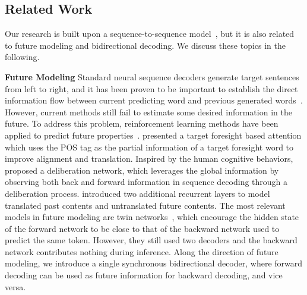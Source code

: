 \documentclass[11pt,a4paper]{article}
\begin{document}
\begin{CJK*}{UTF8}{gbsn}
\section{Related Work}

Our research is built upon a sequence-to-sequence model~\cite{vaswani2017attention}, but it is also related to future modeling and bidirectional decoding. We discuss these topics in the following.

\textbf{Future Modeling} Standard neural sequence decoders generate target sentences from left to right,
and it has been proven to be important to establish the direct information flow between current predicting word and previous generated words~\cite{zhou2017,vaswani2017attention}.
However, current methods still fail to estimate some desired information in the future.
To address this problem, reinforcement learning methods have been applied to predict future properties~\cite{li2017learning,bahdanau2017actor,he2017decoding}.
 presented a target foresight based attention which uses the POS tag as the partial information of a target foresight word to improve alignment and translation.
Inspired by the human cognitive behaviors,  proposed a deliberation network, which leverages the global information by observing both back and forward information in sequence decoding through a deliberation process.
 introduced two additional recurrent layers to model translated past contents and untranslated future contents.
The most relevant models in future modeling are twin networks~\cite{serdyuk2018twin}, which encourage the hidden state of the forward network to be close to that of the backward network used to predict the same token.
However, they still used two decoders and the backward network contributes nothing during inference.
Along the direction of future modeling, we introduce a single synchronous bidirectional decoder, where forward decoding can be used as future information for backward decoding, and vice versa.



\end{CJK*}
\end{document}
